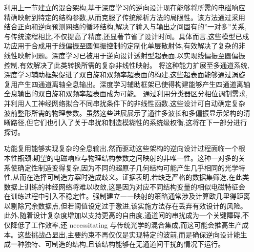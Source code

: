 \documentclass[11pt]{article}
\begin{document}
利用上一节建立的混合架构,基于深度学习的逆向设计现在能够将所需的电磁响应精确映射到特定的结构参数,从而克服了传统解析方法的局限性。该方法通过采用结合正向和逆向预测网络的循环结构,解决了输入与输出之间固有的''一对多''关系,与传统流程相比,不仅提高了精度,还显著节省了设计时间。具体而言,这些模型已成功应用于合成用于线偏振至圆偏振控制的定制化单层散射体,有效解决了复杂的非线性映射问题。深度学习已被用于逆向设计透射型超表面,以实现线偏振至圆偏振控制,有效解决了此类转换所需的复杂非线性映射。\citep{doi_10_1088_1361_6463_acefdf_20072f6c} 将这种能力扩展至多通道系统,深度学习辅助框架促进了双自旋和双频率超表面的构建,这些超表面能够通过涡旋复用产生四通道离轴全息输出。深度学习辅助框架已使得构建能够产生四通道离轴全息输出的双自旋和双频率超表面成为可能。\citep{doi_10_1117_1_apn_2_1_016010_57069347} 通过利用分类器区分相位调制需求,并利用人工神经网络拟合不同串扰条件下的非线性函数,这些设计可自动确定复杂波前整形所需的物理参数。虽然这些进展展示了通往多波长和多偏振显示架构的清晰路径,但它们也引入了关于串扰和制造模糊性的系统级权衡,这将在下一部分进行探讨。\citep{doi_10_1088_1361_6463_acefdf_20072f6c} \citep{doi_10_1117_1_apn_2_1_016010_57069347}

功能复用能够实现复杂的全息输出,然而驱动这些架构的逆向设计过程面临一个根本性瓶颈:期望的电磁响应与物理结构参数之间映射的非唯一性。这种一对多的关系使确定性制造变得复杂,因为不同的超原子几何结构可能产生几乎相同的光学特性,从而在选择可制造方案时造成歧义。证据表明,若缺乏严格的数据集筛选,在此类数据上训练的神经网络将难以收敛,这是因为对应不同结构变量的相似电磁特征会在训练过程中引入不稳定性。强制建立一一映射的策略通常涉及计算欧几里得距离以剔除冗余数据点,但若阈值设定过于激进,该实施方法存在丢弃有效设计的风险。此外,随着设计复杂度增加以支持更高的自由度,通道间的串扰成为一个关键障碍,不仅降低了工作效率,还 necessitating 与传统光学的混合集成,而这可能会推高生产成本。这些挑战凸显出,主要约束不再仅仅是实现特定的波前,而是确保逆向设计能生成一种独特、可制造的结构,且该结构能够在无通道间干扰的情况下运行。\citep{doi_10_1088_1361_6463_ad3e05_d24e0a0a} \citep{doi_10_1515_nanoph_2025_0269_b999ce93} \citep{doi_10_1038_s41467_026_76714_x_8ca5d39b}
\end{document}
